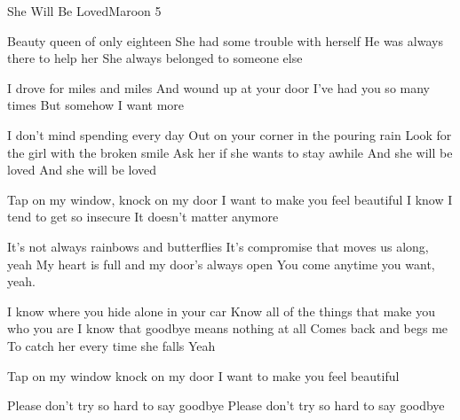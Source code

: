 \begin{Song}{She Will Be Loved}{Maroon 5}

\begin{multicols}{2}
\begin{Verse}
Beauty queen of only eighteen
She had some trouble with herself
He was always there to help her
She always belonged to someone else
\end{Verse}
\espaceInterStrophe

\begin{PreChorus}
I drove for miles and miles
And wound up at your door
I've had you so many times
But somehow I want more
\end{PreChorus}
\espaceInterStrophe

\begin{Chorus}
I don't mind spending every day
Out on your corner in the pouring rain
Look for the girl with the broken smile
Ask her if she wants to stay awhile
And she will be loved
And she will be loved
\end{Chorus}
\espaceInterStrophe

\begin{Verse}
Tap on my window, knock on my door
I want to make you feel beautiful
I know I tend to get so insecure
It doesn't matter anymore
\end{Verse}
\vfill
\columnbreak

\begin{PreChorus}
It's not always rainbows and butterflies
It's compromise that moves us along, yeah
My heart is full and my door's always open
You come anytime you want, yeah.
\end{PreChorus}
\espaceInterStrophe

\tochorus
\espaceInterStrophe

\begin{Bridge}
I know where you hide alone in your car
Know all of the things that make you who you are
I know that goodbye means nothing at all
Comes back and begs me
To catch her every time she falls
Yeah
\end{Bridge}
\espaceInterStrophe

\begin{Verse}
Tap on my window knock on my door
I want to make you feel beautiful
\end{Verse}
\espaceInterStrophe

\tochorus
\espaceInterStrophe

\begin{Chorus}
Please don't try so hard to say goodbye
Please don't try so hard to say goodbye
\end{Chorus}
\espaceInterStrophe
\end{multicols}
\vfill


\end{Song}
